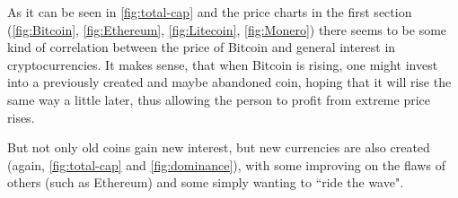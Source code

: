 \documentclass[11pt,a4paper,compsoc,conference]{IEEEtran}
\begin{document}
As it can be seen in \autoref{fig:total-cap} and the price charts in the first section (\autoref{fig:Bitcoin}, \autoref{fig:Ethereum}, \autoref{fig:Litecoin}, \autoref{fig:Monero}) there seems to be some kind of correlation between the price of Bitcoin and general interest in cryptocurrencies. It makes sense, that when Bitcoin is rising, one might invest into a previously created and maybe abandoned coin, hoping that it will rise the same way a little later, thus allowing the person to profit from extreme price rises. 

But not only old coins gain new interest, but new currencies are also created (again, \autoref{fig:total-cap} and \autoref{fig:dominance}), with some improving on the flaws of others (such as Ethereum) and some simply wanting to ``ride the wave". 

\begin{table}
\centering
{}
\end{table}
\end{document}
